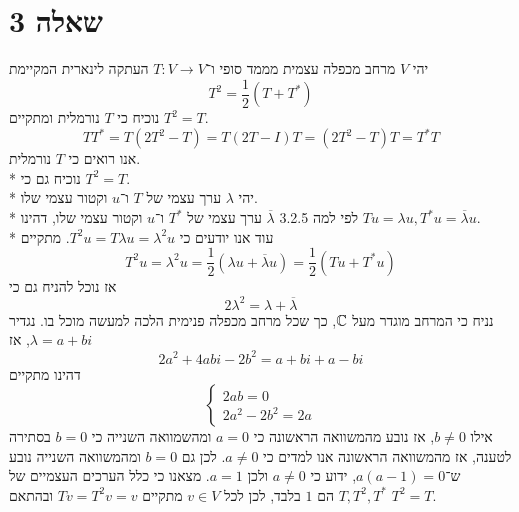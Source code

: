\section{שאלה 3}
יהי $V$ מרחב מכפלה עצמית מממד סופי ו־$T: V \to V$ העתקה לינארית המקיימת
\[
	T^2 = \frac{1}{2}(T + T^*)
\]
נוכיח כי $T$ נורמלית ומתקיים $T^2 = T$.
\[
	T T^* = T (2T^2 - T) = T (2T - I) T = (2T^2 - T) T = T^* T
\]
אנו רואים כי $T$ נורמלית. \\*
נוכיח גם כי $T^2 = T$. \\*
יהי $\lambda$ ערך עצמי של $T$ ו־$u$ וקטור עצמי שלו. \\*
לפי למה 3.2.5 $\overline{\lambda}$ ערך עצמי של $T^*$ ו־$u$ וקטור עצמי שלו,
דהינו $T u = \lambda u, T^* u = \overline{\lambda} u$. \\*
עוד אנו יודעים כי $T^2 u = T \lambda u = \lambda^2 u$. מתקיים
\[
	T^2 u = \lambda^2 u = \frac{1}{2}(\lambda u + \overline{\lambda} u) = \frac{1}{2}(T u + T^* u)
\]
אז נוכל להניח גם כי
\[
	2 \lambda^2 = \lambda + \overline{\lambda}
\]
נניח כי המרחב מוגדר מעל $\mathbb{C}$, כך שכל מרחב מכפלה פנימית הלכה למעשה מוכל בו.
נגדיר $\lambda = a + bi$, אז
\[
	2a^2 + 4abi - 2b^2 = a + bi + a - bi
\]
דהינו מתקיים
\[
	\begin{cases}
		2ab = 0 \\
		2a^2 - 2b^2 = 2a
	\end{cases}
\]
אילו $b \ne 0$, אז נובע מהמשוואה הראשונה כי $a = 0$ ומהשמוואה השנייה כי $b = 0$ בסתירה לטענה, אז מהמשוואה הראשונה אנו למדים כי $a \ne 0$.
לכן גם $b = 0$ ומהמשוואה השנייה נובע ש־$a(a - 1) = 0$, ידוע כי $a \ne 0$ ולכן $a = 1$.
מצאנו כי כלל הערכים העצמיים של $T, T^2, T^*$ הם $1$ בלבד, לכן לכל $v \in V$ מתקיים $T v = T^2 v = v$ ובהתאם $T^2 = T$.

